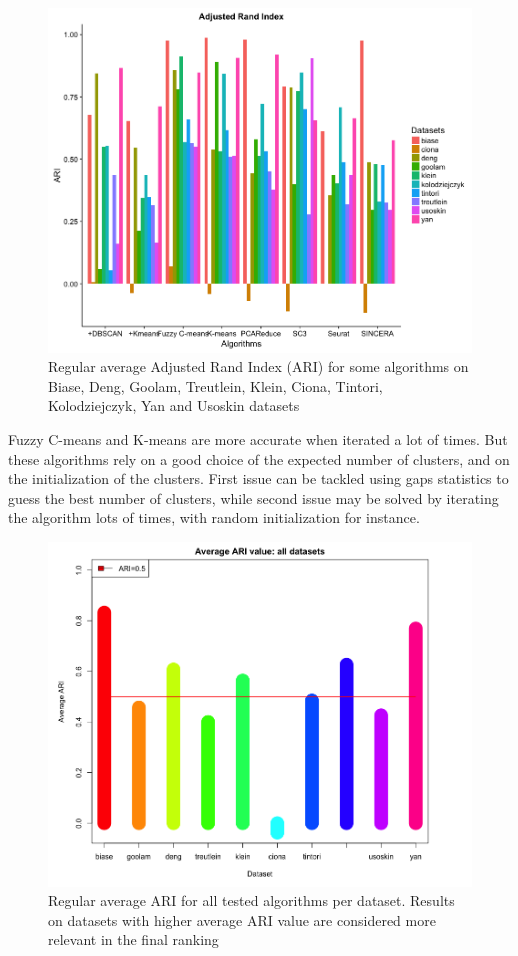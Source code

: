 \documentclass{report}
\begin{document}
{\begin{figure}[H]
\centering
\includegraphics[scale=0.4]{benchmark/ariAll.png}
\caption{Regular average Adjusted Rand Index (ARI) for some algorithms on Biase, Deng, Goolam, Treutlein, Klein, Ciona, Tintori, Kolodziejczyk, Yan and Usoskin datasets}
\label{averageARI}
\end{figure}

Fuzzy C-means and K-means are more accurate when iterated a lot of times. But these algorithms rely on a good choice of the expected number of clusters, and on the initialization of the clusters. First issue can be tackled using gaps statistics\cite{hastie2001estimating} to guess the best number of clusters, while second issue may be solved by iterating the algorithm lots of times, with random initialization for instance.\\

\begin{figure}[H]
\centering
\includegraphics[scale=0.35]{benchmark/ariAverageAllDatasets.png}
\caption{Regular average ARI for all tested algorithms per dataset. Results on datasets with higher average ARI value are considered more relevant in the final ranking}
\label{ariDataset}
\end{figure}

}
\end{document}

